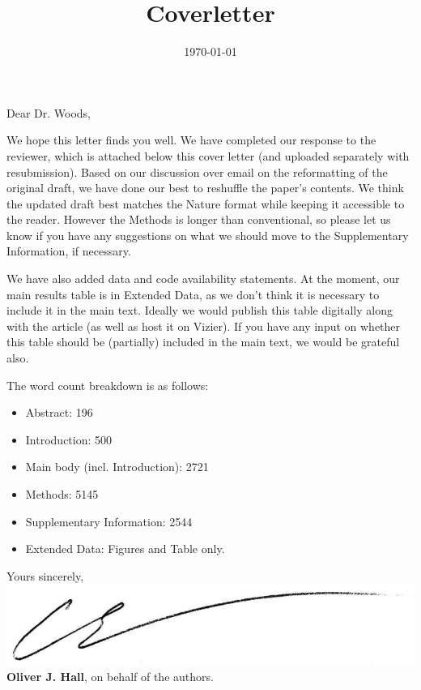 \documentclass[11pt, a4paper, sans, colorlinks, linkcolor=True]{moderncv}
\title{Coverletter}
\begin{document}
\hypersetup{urlcolor=links}
\recipient{\ }{\ }
\date{\today}
\opening{Dear Dr. Woods,}
\makelettertitle
\justify
\vspace{-0.5cm}

We hope this letter finds you well. We have completed our response to the reviewer, which is attached below this cover letter (and uploaded separately with resubmission). Based on our discussion over email on the reformatting of the original draft, we have done our best to reshuffle the paper's contents. We think the updated draft best matches the Nature format while keeping it accessible to the reader. However the Methods is longer than conventional, so please let us know if you have any suggestions on what we should move to the Supplementary Information, if necessary.

We have also added data and code availability statements. At the moment, our main results table is in Extended Data, as we don't think it is necessary to include it in the main text. Ideally we would publish this table digitally along with the article (as well as host it on Vizier). If you have any input on whether this table should be (partially) included in the main text, we would be grateful also.

The word count breakdown is as follows:
\begin{itemize}
	\item Abstract: 196
	\item Introduction: 500
	\item Main body (incl. Introduction): 2721
	\item Methods: 5145
	\item Supplementary Information: 2544
	\item Extended Data: Figures and Table only.
\end{itemize}

\vspace{0.5cm}

Yours sincerely, \\
\vspace{0.5em}
\includegraphics[scale=0.2]{signature.png} \\ 
\vspace{0.5em}
\textbf{Oliver J. Hall}, on behalf of the authors. \\
\end{document}
